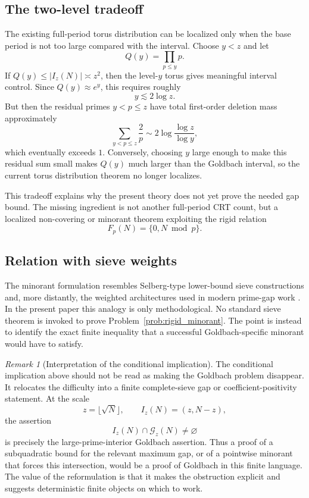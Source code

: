 \documentclass[11pt]{article}
\theoremstyle{plain}
\theoremstyle{definition}
\theoremstyle{remark}
\newtheorem{remark}[theorem]{Remark}
\newcommand{\G}{\mathcal G}
\begin{document}
\subsection{The two-level tradeoff}

The existing full-period torus distribution can be localized only when the base
period is not too large compared with the interval.  Choose \(y<z\) and let
\[
Q(y)=\prod_{p\le y}p.
\]
If \(Q(y)\le |I_z(N)|\asymp z^2\), then the level-\(y\) torus gives meaningful
interval control.  Since \(Q(y)\approx e^y\), this requires roughly
\[
y\lesssim 2\log z.
\]
But then the residual primes \(y<p\le z\) have total first-order deletion mass
approximately
\[
\sum_{y<p\le z}\frac{2}{p}
\sim
2\log\frac{\log z}{\log y},
\]
which eventually exceeds \(1\).  Conversely, choosing \(y\) large enough to make
this residual sum small makes \(Q(y)\) much larger than the Goldbach interval,
so the current torus distribution theorem no longer localizes.

This tradeoff explains why the present theory does not yet prove the needed
gap bound.  The missing ingredient is not another full-period CRT count, but a
localized non-covering or minorant theorem exploiting the rigid relation
\[
F_p(N)=\{0,N\bmod p\}.
\]

\subsection{Relation with sieve weights}

The minorant formulation resembles Selberg-type lower-bound sieve constructions
and, more distantly, the weighted architectures used in modern prime-gap work
\cite{HalberstamRichert1974,Maynard2016}.  In the present paper this analogy is
only methodological.  No standard sieve theorem is invoked to prove
Problem~\ref{prob:rigid_minorant}.  The point is instead to identify the exact
finite inequality that a successful Goldbach-specific minorant would have to
satisfy.


\begin{remark}[Interpretation of the conditional implication]
The conditional implication above should not be read as making the Goldbach
problem disappear.  It relocates the difficulty into a finite complete-sieve gap
or coefficient-positivity statement.  At the scale
\[
z=\lfloor\sqrt N\rfloor,\qquad I_z(N)=(z,N-z),
\]
the assertion
\[
I_z(N)\cap\G_z(N)\ne\varnothing
\]
is precisely the large-prime-interior Goldbach assertion.  Thus a proof of a
subquadratic bound for the relevant maximum gap, or of a pointwise minorant that
forces this intersection, would be a proof of Goldbach in this finite language.
The value of the reformulation is that it makes the obstruction explicit and
suggests deterministic finite objects on which to work.
\end{remark}
\end{document}
